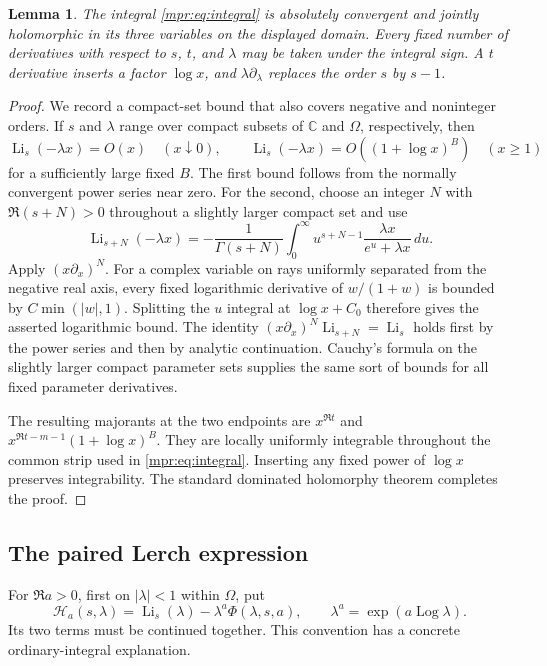 \documentclass[11pt,letterpaper]{article}
\numberwithin{equation}{section}
\newtheorem{lemma}[theorem]{Lemma}
\theoremstyle{definition}
\theoremstyle{remark}
\begin{document}
\begin{lemma}\label{mpr:lem:holomorphic}
The integral \eqref{mpr:eq:integral} is absolutely convergent and jointly
holomorphic in its three variables on the displayed domain.  Every fixed
number of derivatives with respect to $s$, $t$, and $\lambda$ may be taken
under the integral sign.  A $t$ derivative inserts a factor $\log x$, and
$\lambda\partial_\lambda$ replaces the order $s$ by $s-1$.
\end{lemma}

\begin{proof}
We record a compact-set bound that also covers negative and noninteger
orders.  If $s$ and $\lambda$ range over compact subsets of $\mathbb C$
and $\Omega$, respectively, then
\[
 \operatorname{Li}_s(-\lambda x)=O(x)\quad(x\downarrow0),\qquad
 \operatorname{Li}_s(-\lambda x)=O((1+\log x)^B)\quad(x\ge1)
\]
for a sufficiently large fixed $B$.  The first bound follows from the
normally convergent power series near zero.  For the second, choose an
integer $N$ with $\Re(s+N)>0$ throughout a slightly larger compact set and
use
\[
 \operatorname{Li}_{s+N}(-\lambda x)
 =-\frac1{\Gamma(s+N)}\int_0^\infty
        u^{s+N-1}\frac{\lambda x}{e^u+\lambda x}\,du.
\]
Apply $(x\partial_x)^N$.  For a complex variable on rays uniformly
separated from the negative real axis, every fixed logarithmic derivative
of $w/(1+w)$ is bounded by $C\min(|w|,1)$.  Splitting the $u$ integral
at $\log x+C_0$ therefore gives the asserted logarithmic bound.
The identity $(x\partial_x)^N\operatorname{Li}_{s+N}
=\operatorname{Li}_s$ holds first by the power series and then by analytic
continuation.  Cauchy's formula on the slightly larger compact parameter
sets supplies the same sort of bounds for all fixed parameter derivatives.

The resulting majorants at the two endpoints are
$x^{\Re t}$ and $x^{\Re t-m-1}(1+\log x)^B$.  They are locally uniformly
integrable throughout the common strip used in
\eqref{mpr:eq:integral}.  Inserting any fixed power of $\log x$ preserves
integrability.  The standard dominated holomorphy theorem completes the
proof.
\end{proof}

\subsection{The paired Lerch expression}

For $\Re a>0$, first on $|\lambda|<1$ within $\Omega$, put
\begin{equation}\label{mpr:eq:Hdefinition}
 \mathcal H_a(s,\lambda)
 =\operatorname{Li}_s(\lambda)
        -\lambda^a\Phi(\lambda,s,a),
 \qquad \lambda^a=\exp(a\operatorname{Log}\lambda).
\end{equation}
Its two terms must be continued together.  This convention has a concrete
ordinary-integral explanation.
\end{document}
